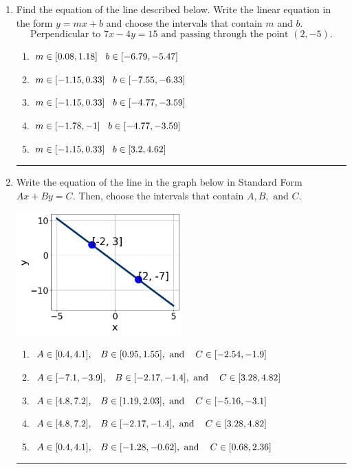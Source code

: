 \documentclass[14pt]{extbook}
\newcommand{\litem}[1]{\item#1\hspace*{-1cm}\rule{\textwidth}{0.4pt}}
\begin{document}
\begin{enumerate}
{\begin{enumerate}[label=\Alph*.]
\end{enumerate} }
\litem{
Find the equation of the line described below. Write the linear equation in the form $ y=mx+b $ and choose the intervals that contain $m$ and $b$.\[ \text{Perpendicular to } 7 x - 4 y = 15 \text{ and passing through the point } (2, -5). \]\begin{enumerate}[label=\Alph*.]
\item \( m \in [0.08, 1.18] \hspace*{3mm} b \in [-6.79, -5.47] \)
\item \( m \in [-1.15, 0.33] \hspace*{3mm} b \in [-7.55, -6.33] \)
\item \( m \in [-1.15, 0.33] \hspace*{3mm} b \in [-4.77, -3.59] \)
\item \( m \in [-1.78, -1] \hspace*{3mm} b \in [-4.77, -3.59] \)
\item \( m \in [-1.15, 0.33] \hspace*{3mm} b \in [3.2, 4.62] \)

\end{enumerate} }
\litem{
Write the equation of the line in the graph below in Standard Form $Ax+By=C$. Then, choose the intervals that contain $A, B, \text{ and } C$.
\begin{center}
    \includegraphics[width=0.5\textwidth]{../Figures/linearGraphToStandardCopyB.png}
\end{center}
\begin{enumerate}[label=\Alph*.]
\item \( A \in [0.4, 4.1], \hspace{3mm} B \in [0.95, 1.55], \text{ and } \hspace{3mm} C \in [-2.54, -1.9] \)
\item \( A \in [-7.1, -3.9], \hspace{3mm} B \in [-2.17, -1.4], \text{ and } \hspace{3mm} C \in [3.28, 4.82] \)
\item \( A \in [4.8, 7.2], \hspace{3mm} B \in [1.19, 2.03], \text{ and } \hspace{3mm} C \in [-5.16, -3.1] \)
\item \( A \in [4.8, 7.2], \hspace{3mm} B \in [-2.17, -1.4], \text{ and } \hspace{3mm} C \in [3.28, 4.82] \)
\item \( A \in [0.4, 4.1], \hspace{3mm} B \in [-1.28, -0.62], \text{ and } \hspace{3mm} C \in [0.68, 2.36] \)


\end{enumerate}}
\end{enumerate}
\end{document}
